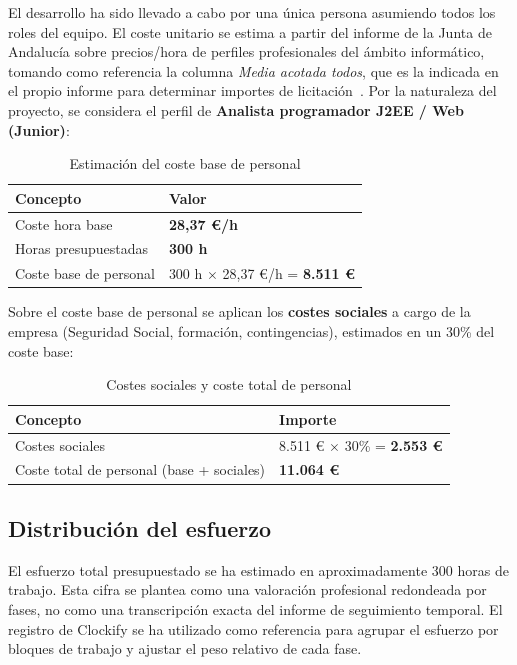 El desarrollo ha sido llevado a cabo por una única persona asumiendo todos los roles del equipo. El coste unitario se estima a partir del informe de la Junta de Andalucía sobre precios/hora de perfiles profesionales del ámbito informático, tomando como referencia la columna \textit{Media acotada todos}, que es la indicada en el propio informe para determinar importes de licitación~\cite{junta2018perfiles}. Por la naturaleza del proyecto, se considera el perfil de \textbf{Analista programador J2EE / Web (Junior)}:

\begin{table}[H]
\centering
\caption{Estimación del coste base de personal}
\label{tab:coste_base_personal}
\begin{tabular}{p{7cm}p{5cm}}
\toprule
\textbf{Concepto} & \textbf{Valor} \\
\midrule
Coste hora base & \textbf{28,37 €/h} \\
Horas presupuestadas & \textbf{300 h} \\
Coste base de personal & 300 h $\times$ 28,37 €/h = \textbf{8.511 €} \\
\bottomrule
\end{tabular}
\end{table}

Sobre el coste base de personal se aplican los \textbf{costes sociales} a cargo de la empresa (Seguridad Social, formación, contingencias), estimados en un 30\% del coste base:

\begin{table}[H]
\centering
\caption{Costes sociales y coste total de personal}
\label{tab:costes_sociales_personal}
\begin{tabular}{p{7cm}p{5cm}}
\toprule
\textbf{Concepto} & \textbf{Importe} \\
\midrule
Costes sociales & 8.511 € $\times$ 30\% = \textbf{2.553 €} \\
Coste total de personal (base + sociales) & \textbf{11.064 €} \\
\bottomrule
\end{tabular}
\end{table}

\subsection{Distribución del esfuerzo}

El esfuerzo total presupuestado se ha estimado en aproximadamente 300 horas de trabajo. Esta cifra se plantea como una valoración profesional redondeada por fases, no como una transcripción exacta del informe de seguimiento temporal. El registro de Clockify se ha utilizado como referencia para agrupar el esfuerzo por bloques de trabajo y ajustar el peso relativo de cada fase.

